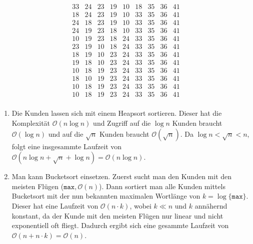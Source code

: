 \documentclass[a4paper,11pt]{article}             %
\begin{document}
\begin{enumerate}
\begin{equation*}
\begin{array}{ccccccccc}
33 & 24 & 23 & 19 & 10 & 18 & \textit{35} & \textit{36} & \textit{41}\\
18 & 24 & 23 & 19 & 10 & \textit{33} & \textit{35} & \textit{36} & \textit{41}\\
24 & 18 & 23 & 19 & 10 & \textit{33} & \textit{35} & \textit{36} & \textit{41}\\
24 & 19 & 23 & 18 & 10 & \textit{33} & \textit{35} & \textit{36} & \textit{41}\\
10 & 19 & 23 & 18 & \textit{24} & \textit{33} & \textit{35} & \textit{36} & \textit{41}\\
23 & 19 & 10 & 18 & \textit{24} & \textit{33} & \textit{35} & \textit{36} & \textit{41}\\
18 & 19 & 10 & \textit{23} & \textit{24} & \textit{33} & \textit{35} & \textit{36} & \textit{41}\\
19 & 18 & 10 & \textit{23} & \textit{24} & \textit{33} & \textit{35} & \textit{36} & \textit{41}\\
10 & 18 & \textit{19} & \textit{23} & \textit{24} & \textit{33} & \textit{35} & \textit{36} & \textit{41}\\
18 & 10 & \textit{19} & \textit{23} & \textit{24} & \textit{33} & \textit{35} & \textit{36} & \textit{41}\\
10 & \textit{18} & \textit{19} & \textit{23} & \textit{24} & \textit{33} & \textit{35} & \textit{36} & \textit{41}\\
\textit{10} & \textit{18} & \textit{19} & \textit{23} & \textit{24} & \textit{33} & \textit{35} & \textit{36} & \textit{41}\\
\end{array}
\end{equation*}
\end{enumerate}

\begin{enumerate}
\item Die Kunden lassen sich mit einem Heapsort sortieren. Dieser hat die Komplexität $\mathcal O(n \log n)$ und Zugriff auf die $\log n$ Kunden braucht $\mathcal O(\log n)$ und auf die $\sqrt{n}$ Kunden braucht $\mathcal O(\sqrt n)$. Da $\log n < \sqrt{n} < n$, folgt eine insgesammte Laufzeit von $\mathcal O(n\log n + \sqrt{n} + \log n) = \mathcal O(n\log n)$.

\item Man kann Bucketsort einsetzen. Zuerst sucht man den Kunden mit den meisten Flügen ($\texttt{max}, \mathcal O(n)$). Dann sortiert man alle Kunden mittels Bucketsort mit der nun bekannten maximalen Wortlänge von $k = \log\{\texttt{max}\}$. Dieser hat eine Laufzeit von $\mathcal O(n\cdot k)$, wobei $k \ll n$ und $k$ annähernd konstant, da der Kunde mit den meisten Flügen nur linear und nicht exponentiell oft fliegt. Dadurch ergibt sich eine gesammte Laufzeit von $\mathcal O(n + n\cdot k) = \mathcal O(n)$.
\end{enumerate}
\end{document}
